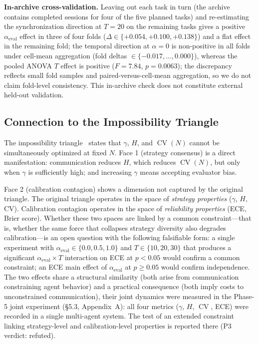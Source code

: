 \documentclass[11pt]{article}
\DeclareMathOperator{\CV}{CV}
\begin{document}
\noindent\textbf{In-archive cross-validation.} Leaving out each task in turn (the archive contains completed sessions for four of the five planned tasks) and re-estimating the synchronization direction at $T{=}20$ on the remaining tasks gives a positive $\alpha_{\text{eval}}$ effect in three of four folds ($\Delta \in \{+0.054, +0.100, +0.138\}$) and a flat effect in the remaining fold; the temporal direction at $\alpha{=}0$ is non-positive in all folds under cell-mean aggregation (fold deltas $\in \{-0.017, \ldots, 0.000\}$), whereas the pooled ANOVA $T$ effect is positive ($F=7.84$, $p=0.0063$); the discrepancy reflects small fold samples and paired-versus-cell-mean aggregation, so we do not claim fold-level consistency. This in-archive check does not constitute external held-out validation.

\subsection{Connection to the Impossibility Triangle}

The impossibility triangle~\cite{liu2026impossible} states that $\gamma$, $H$, and $\CV(N)$ cannot be simultaneously optimized at fixed $N$. Face 1 (strategy consensus) is a direct manifestation: communication reduces $H$, which reduces $\CV(N)$, but only when $\gamma$ is sufficiently high; and increasing $\gamma$ means accepting evaluator bias.

Face 2 (calibration contagion) shows a dimension not captured by the original triangle. The original triangle operates in the space of \textit{strategy properties} ($\gamma$, $H$, CV). Calibration contagion operates in the space of \textit{reliability properties} (ECE, Brier score). Whether these two spaces are linked by a common constraint---that is, whether the same force that collapses strategy diversity also degrades calibration---is an open question with the following falsifiable form: a single experiment with $\alpha_{\text{eval}} \in \{0.0, 0.5, 1.0\}$ and $T \in \{10, 20, 30\}$ that produces a significant $\alpha_{\text{eval}} \times T$ interaction on ECE at $p < 0.05$ would confirm a common constraint; an ECE main effect of $\alpha_{\text{eval}}$ at $p \geq 0.05$ would confirm independence. The two effects share a structural similarity (both arise from communication constraining agent behavior) and a practical consequence (both imply costs to unconstrained communication), their joint dynamics were measured in the Phase-5 joint experiment (§5.3, Appendix~A): all four metrics ($\gamma$, $H$, $\CV$, ECE) were recorded in a single multi-agent system. The test of an extended constraint linking strategy-level and calibration-level properties is reported there (P3 verdict: refuted).
\end{document}
